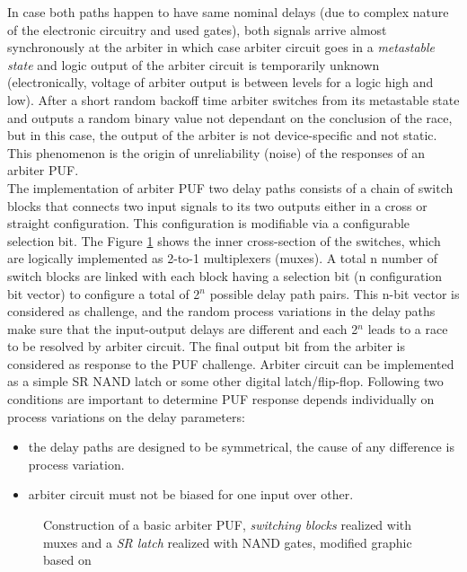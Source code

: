 In case both paths happen to have same nominal delays (due to complex nature of the electronic circuitry and used gates), both signals arrive almost synchronously at the arbiter in which case arbiter circuit goes in a \emph{metastable state} and logic output of the arbiter circuit is temporarily unknown (electronically, voltage of arbiter output is between levels for a logic high and low). After a short random backoff time arbiter switches from its metastable state and outputs a random binary
value not dependant on the conclusion of the race, but in this case, the output of the arbiter is not device-specific and not static. This phenomenon is the origin of unreliability (noise) of the responses of an arbiter PUF.\\

The implementation of arbiter PUF two delay paths consists of a chain of switch blocks that connects two input signals to its two outputs either in a cross or straight configuration. This configuration is modifiable via a configurable selection bit. The Figure \ref{img:arbiter} shows the inner cross-section of the switches, which are logically implemented as 2-to-1 multiplexers (muxes). A total n number of switch blocks are linked with each block having a selection bit (n configuration bit vector) to
configure a total of 2$^n$ possible delay path pairs. This n-bit vector is considered as challenge, and the random process variations in the delay paths make sure that the input-output delays are different and each 2$^n$ leads to a race to be resolved by arbiter circuit. The final output bit from the arbiter is considered as response to the PUF challenge. Arbiter circuit can be implemented as a simple SR NAND latch or some other digital latch/flip-flop. Following two conditions are
important to determine PUF response depends individually on process variations on the delay parameters:
\begin{itemize}
	\item the delay paths are designed to be symmetrical, the cause of any difference is process variation.
	\item arbiter circuit must not be biased for one input over other.
\end{itemize}

\begin{figure}
	\centering
	\caption{Construction of a basic arbiter PUF, \emph{switching blocks} realized with muxes and a \emph{SR latch} realized with NAND gates, modified graphic based on \cite{17,18,38}}
	\label{img:arbiter}
\end{figure}

